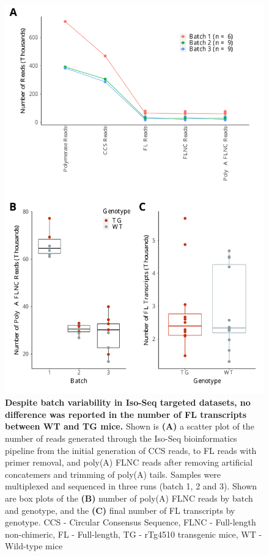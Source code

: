 \begin{figure}[!htp]
	\begin{center}
		\includegraphics[page=1,trim={0 1cm 0 0},clip,scale = 0.55]{Figures/TargetedTranscriptome.pdf}
	\end{center}
	\captionsetup{width=0.95\textwidth}
	\caption[Iso-Seq sequencing metrics from targeted profiling of rTg4510 mice]%
	{\textbf{Despite batch variability in Iso-Seq targeted datasets, no difference was reported in the number of FL transcripts between WT and TG mice.} Shown is \textbf{(A)} a scatter plot of the number of reads generated through the Iso-Seq bioinformatics pipeline from the initial generation of CCS reads, to FL reads with primer removal, and poly(A) FLNC reads after removing artificial concatemers and trimming of poly(A) tails. Samples were multiplexed and sequenced in three runs (batch 1, 2 and 3). Shown are box plots of the \textbf{(B)} number of poly(A) FLNC reads by batch and genotype, and the \textbf{(C)} final number of FL transcripts by genotype. CCS - Circular Consensus Sequence, FLNC - Full-length non-chimeric, FL - Full-length, TG - rTg4510 transgenic mice, WT - Wild-type mice}
	\label{fig:isoseq_targeted_run_output}
\end{figure}

